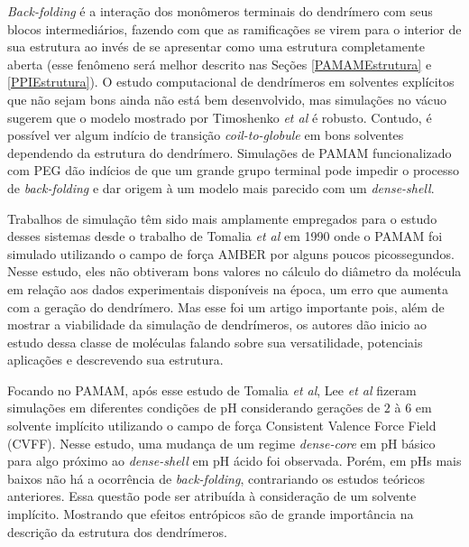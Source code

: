 \textit{Back-folding} é a interação dos monômeros terminais do dendrímero com seus blocos intermediários, fazendo com que as ramificações se virem para o interior de sua estrutura ao invés de se apresentar como uma estrutura completamente aberta (esse fenômeno será melhor descrito nas Seções \ref{PAMAMEstrutura} e \ref{PPIEstrutura}). 
O estudo computacional de dendrímeros em solventes explícitos que não sejam bons ainda não está bem desenvolvido, mas simulações no vácuo sugerem que o modelo mostrado por Timoshenko \textit{et al}\cite{Timoshenko2002} é robusto.
Contudo, é possível ver algum indício de transição \textit{coil-to-globule} em bons solventes dependendo da estrutura do dendrímero.
Simulações de PAMAM funcionalizado com PEG\cite{Lee2011} dão indícios de que um grande grupo terminal pode impedir o processo de \textit{back-folding} e dar origem à um modelo mais parecido com um \textit{dense-shell}.

Trabalhos de simulação têm sido mais amplamente empregados para o estudo desses sistemas desde o trabalho de Tomalia \textit{et al}\cite{Tomalia1990} em 1990 onde o PAMAM foi simulado utilizando o campo de força AMBER\cite{Weiner1984} por alguns poucos picossegundos.
Nesse estudo, eles não obtiveram bons valores no cálculo do diâmetro da molécula em relação aos dados experimentais disponíveis na época, um erro que aumenta com a geração do dendrímero.
Mas esse foi um artigo importante pois, além de mostrar a viabilidade da simulação de dendrímeros, os autores dão inicio ao estudo dessa classe de moléculas falando sobre sua versatilidade, potenciais aplicações e descrevendo sua estrutura.

Focando no PAMAM, após esse estudo de Tomalia \textit{et al}\cite{Tomalia1990}, Lee \textit{et al}\cite{Lee2002} fizeram simulações em diferentes condições de pH considerando gerações de $2$ à $6$ em solvente implícito utilizando o campo de força Consistent Valence Force Field\cite{Lifson1979} (CVFF).
Nesse estudo, uma mudança de um regime \textit{dense-core} em pH básico para algo próximo ao \textit{dense-shell} em pH ácido foi observada.
Porém, em pHs mais baixos não há a ocorrência de \textit{back-folding}, contrariando os estudos teóricos anteriores.
Essa questão pode ser atribuída à consideração de um solvente implícito. 
Mostrando que efeitos entrópicos são de grande importância na descrição da estrutura dos dendrímeros.

